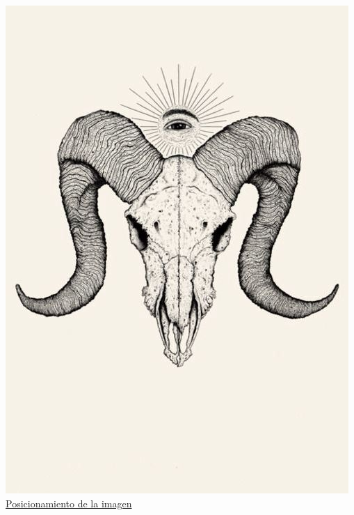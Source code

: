 \documentclass[]{article} %
\begin{document}
        \includegraphics[width=\textwidth]{dd70b1b87d300d20fcfaf566f13de977.jpg}\\

        \underline{Posicionamiento de la imagen}
\end{document}
